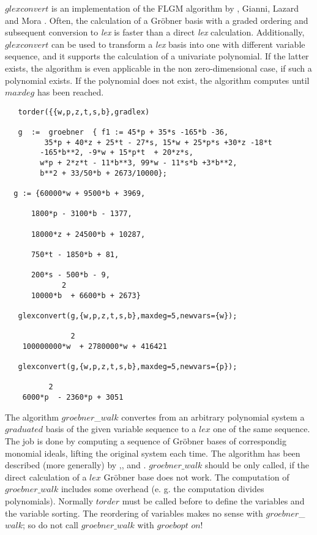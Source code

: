 $glexconvert$ is an implementation of the FLGM algorithm by
, {\sc Gianni}, {\sc Lazard} and {\sc
Mora} \cite{Faugere:93}. Often, the calculation of a Gr\"obner basis
with a graded ordering and subsequent conversion to {\it lex} is
faster than a direct {\it lex} calculation. Additionally, $glexconvert$
can be used to transform a {\it lex} basis into one with different
variable sequence, and it supports the calculation of a univariate
polynomial. If the latter exists, the algorithm is even applicable in
the non zero-dimensional case, if such a polynomial exists.
If the polynomial does not exist, the algorithm computes  until $maxdeg$
has been reached.
\begin{verbatim}
   torder({{w,p,z,t,s,b},gradlex)

   g  :=  groebner  { f1 := 45*p + 35*s -165*b -36,
         35*p + 40*z + 25*t - 27*s, 15*w + 25*p*s +30*z -18*t
        -165*b**2, -9*w + 15*p*t  + 20*z*s,
        w*p + 2*z*t - 11*b**3, 99*w - 11*s*b +3*b**2,
        b**2 + 33/50*b + 2673/10000};

  g := {60000*w + 9500*b + 3969,

      1800*p - 3100*b - 1377,

      18000*z + 24500*b + 10287,

      750*t - 1850*b + 81,

      200*s - 500*b - 9,
             2
      10000*b  + 6600*b + 2673}

   glexconvert(g,{w,p,z,t,s,b},maxdeg=5,newvars={w});

               2
    100000000*w  + 2780000*w + 416421

   glexconvert(g,{w,p,z,t,s,b},maxdeg=5,newvars={p});

          2
    6000*p  - 2360*p + 3051

\end{verbatim}

The algorithm $groebner$\_$walk$ convertes from an arbitrary polynomial
system a $graduated$ basis of the given variable sequence to a $lex$ one
of the same sequence. The job is done by computing a sequence
of Gr\"obner bases of correspondig monomial ideals, lifting the original
system each time. The algorithm has been described (more generally) by
\cite{AmrheinGloorKuechlin:96a},\cite{AmrheinGloorKuechlin:96b},\cite{AmrheinGloor:98} and \cite{Collart:97}.
$groebner\_walk$ should be only called, if the direct calculation of a
$lex$ Gr\"obner base does not work. The computation of $groebner\_walk$
includes some overhead (e. g. the computation divides polynomials).
Normally $torder$ must be called before to define the variables and the variable
sorting. The reordering of variables makes no sense with $groebner$\_$walk$;
so do not call $groebner\_walk$ with $groebopt$ $on$!

